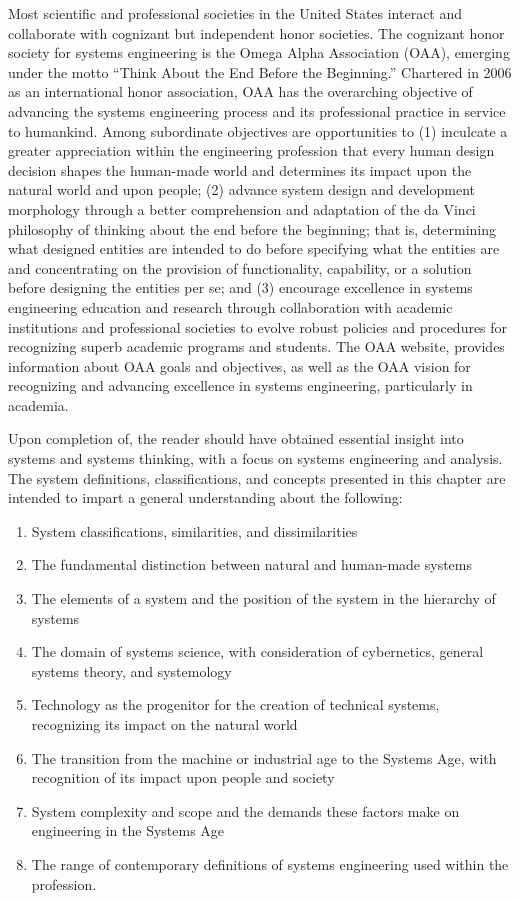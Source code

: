 Most scientific and professional societies in the United States interact and collaborate with cognizant but independent honor societies. The cognizant honor society for systems engineering is the Omega Alpha Association (OAA), emerging under the motto “Think About the End Before the Beginning.” Chartered in 2006 as an international honor association, OAA has the overarching objective of advancing the systems engineering process and its professional practice in service to humankind. Among subordinate objectives are opportunities to (1) inculcate a greater appreciation within the engineering profession that every human design decision shapes the human-made world and determines its impact upon the natural world and upon people; (2) advance system design and development morphology through a better comprehension and adaptation of the da Vinci philosophy of thinking about the end before the beginning; that is, determining what designed entities are intended to do before specifying what the entities are and concentrating on the provision of functionality, capability, or a solution before designing the entities per se; and (3) encourage excellence in systems engineering education and research through collaboration with academic institutions and professional societies to evolve robust policies and procedures for recognizing superb academic programs and students. The OAA website, provides information about OAA goals and objectives, as well as the OAA vision for recognizing and advancing excellence in systems engineering, particularly in academia.

Upon completion of, the reader should have obtained essential insight into systems and systems thinking, with a focus on systems engineering and analysis. The system definitions, classifications, and concepts presented in this chapter are intended to impart a general understanding about the following:

\begin{enumerate}
\item System classifications, similarities, and dissimilarities
\item The fundamental distinction between natural and human-made systems
\item The elements of a system and the position of the system in the hierarchy of systems
\item The domain of systems science, with consideration of cybernetics, general systems theory, and systemology
\item Technology as the progenitor for the creation of technical systems, recognizing its impact on the natural world
\item The transition from the machine or industrial age to the Systems Age, with recognition of its impact upon people and society
\item System complexity and scope and the demands these factors make on engineering in the Systems Age
\item The range of contemporary definitions of systems engineering used within the profession.
\end{enumerate}

